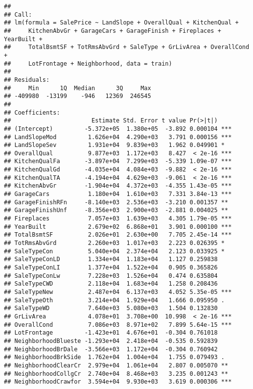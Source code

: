 \documentclass[
]{article}
\begin{document}
\begin{verbatim}
## 
## Call:
## lm(formula = SalePrice ~ LandSlope + OverallQual + KitchenQual + 
##     KitchenAbvGr + GarageCars + GarageFinish + Fireplaces + YearBuilt + 
##     TotalBsmtSF + TotRmsAbvGrd + SaleType + GrLivArea + OverallCond + 
##     LotFrontage + Neighborhood, data = train)
## 
## Residuals:
##     Min      1Q  Median      3Q     Max 
## -409980  -13199    -946   12369  246545 
## 
## Coefficients:
##                       Estimate Std. Error t value Pr(>|t|)    
## (Intercept)         -5.372e+05  1.380e+05  -3.892 0.000104 ***
## LandSlopeMod         1.626e+04  4.290e+03   3.791 0.000156 ***
## LandSlopeSev         1.931e+04  9.839e+03   1.962 0.049901 *  
## OverallQual          9.877e+03  1.172e+03   8.427  < 2e-16 ***
## KitchenQualFa       -3.897e+04  7.299e+03  -5.339 1.09e-07 ***
## KitchenQualGd       -4.035e+04  4.084e+03  -9.882  < 2e-16 ***
## KitchenQualTA       -4.194e+04  4.629e+03  -9.061  < 2e-16 ***
## KitchenAbvGr        -1.904e+04  4.372e+03  -4.355 1.43e-05 ***
## GarageCars           1.180e+04  1.610e+03   7.331 3.84e-13 ***
## GarageFinishRFn     -8.140e+03  2.536e+03  -3.210 0.001357 ** 
## GarageFinishUnf     -8.356e+03  2.900e+03  -2.881 0.004025 ** 
## Fireplaces           7.057e+03  1.639e+03   4.305 1.79e-05 ***
## YearBuilt            2.679e+02  6.868e+01   3.901 0.000100 ***
## TotalBsmtSF          2.026e+01  2.630e+00   7.705 2.45e-14 ***
## TotRmsAbvGrd         2.260e+03  1.017e+03   2.223 0.026395 *  
## SaleTypeCon          5.040e+04  2.374e+04   2.123 0.033925 *  
## SaleTypeConLD        1.334e+04  1.183e+04   1.127 0.259838    
## SaleTypeConLI        1.377e+04  1.522e+04   0.905 0.365826    
## SaleTypeConLw        7.228e+03  1.526e+04   0.474 0.635804    
## SaleTypeCWD          2.118e+04  1.683e+04   1.258 0.208436    
## SaleTypeNew          2.487e+04  6.137e+03   4.052 5.35e-05 ***
## SaleTypeOth          3.214e+04  1.929e+04   1.666 0.095950 .  
## SaleTypeWD           7.640e+03  5.080e+03   1.504 0.132830    
## GrLivArea            4.078e+01  3.708e+00  10.998  < 2e-16 ***
## OverallCond          7.086e+03  8.971e+02   7.899 5.64e-15 ***
## LotFrontage         -1.423e+01  4.676e+01  -0.304 0.761018    
## NeighborhoodBlueste -1.293e+04  2.418e+04  -0.535 0.592839    
## NeighborhoodBrDale  -3.566e+03  1.172e+04  -0.304 0.760942    
## NeighborhoodBrkSide  1.762e+04  1.004e+04   1.755 0.079493 .  
## NeighborhoodClearCr  2.979e+04  1.061e+04   2.807 0.005070 ** 
## NeighborhoodCollgCr  2.740e+04  8.468e+03   3.235 0.001243 ** 
## NeighborhoodCrawfor  3.594e+04  9.930e+03   3.619 0.000306 ***

\end{verbatim}
\end{document}
